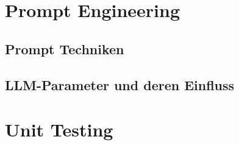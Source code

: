 \section{Prompt Engineering}

\subsection{Prompt Techniken}

\subsection{LLM-Parameter und deren Einfluss}

\section{Unit Testing}


